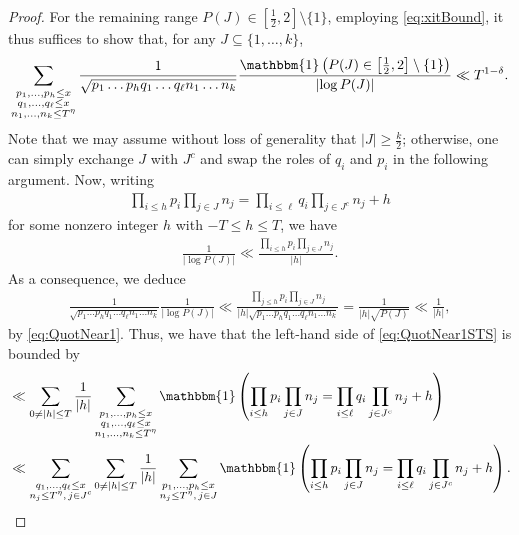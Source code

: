 \documentclass[12pt,oneside,english,a4paper]{amsart}
\theoremstyle{remark}
\numberwithin{equation}{section}
\begin{document}
\begin{proof}
    For the remaining range $P(J)\in[\frac12,2] \setminus \{ 1 \}$, employing \eqref{eq:xitBound}, it thus suffices to show that, for any $J \subseteq \{1,\dots,k\}$,
    \begin{equation}\label{eq:QuotNear1STS} 
        \sum_{\substack{p_1, \dots, p_h  \leq x\\ q_1, \dots, q_\ell\leq x \\ n_1, \dots, n_k \le T^\eta}} 
        \frac{1}{\sqrt{p_1\dots p_h q_1\dots q_\ell n_1\dots n_k}} \frac{\mathbbm{1} \left( P(J) \in \left[ \tfrac{1}{2}, 2 \right] \setminus \{1 \}  \right)}{\left| \log P(J) \right|}  
        \ll T^{1-\delta}.
    \end{equation}
    Note that we may assume without loss of generality that $|J| \ge \frac{k}{2}$; otherwise, one can simply exchange $J$ with $J^c$ and swap the roles of $q_i$ and $p_i$ in the following argument. 
    Now, writing
    \begin{align}\label{eq:shiftbyh}
        \prod_{i\leq h} p_i \prod_{j\in J} n_j=\prod_{i\leq \ell} q_i \prod_{j\in J^c} n_j +h
    \end{align}
    for some nonzero integer $h$ with $-T\leq h\leq T$, we have
    \begin{align*}
        \frac{1}{\vert \log P(J)\vert}\ll \frac{\prod_{i\leq h} p_i \prod_{j\in J} n_j}{\vert h\vert}.
    \end{align*}
    As a consequence, we deduce
    \begin{align*}
        \frac{1}{\sqrt{p_1\dots p_h q_1\dots q_\ell n_1\dots n_k}} \frac{1}{\left| \log P(J) \right|} 
        \ll  \frac{\prod_{j\leq h} p_i \prod_{j\in J} n_j}{|h|\sqrt{p_1\dots p_h q_1\dots q_\ell n_1\dots n_k}} 
        = \frac{1}{|h|\sqrt{P(J)}} 
        \ll \frac{1}{|h|}  ,
    \end{align*}
    by \eqref{eq:QuotNear1}. Thus, we have that the left-hand side of \eqref{eq:QuotNear1STS} is bounded by
    \begin{align*}
        &\ll \sum_{0\neq |h| \leq T} \frac{1}{|h|} \sum_{\substack{p_1, \dots, p_h  \leq x\\ q_1, \dots, q_\ell\leq x \\ n_1, \dots, n_k  \leq T^\eta}} \mathbbm{1} \left( \prod_{i\leq h} p_i \prod_{j\in J} n_j = \prod_{i\leq \ell} q_i \prod_{j\in J^c} n_j+h \right)\\
        &\ll \sum_{\substack{q_1,\dots,q_\ell \leq x \\ n_j\leq T^\eta,\, j\in J^c}}  \sum_{0\neq |h| \leq T} \frac{1}{|h|} \sum_{\substack{p_1, \dots, p_h  \leq x \\ n_j \leq T^\eta, \, j\in J}} \mathbbm{1} \left( \prod_{i\leq h} p_i \prod_{j\in J} n_j = \prod_{i\leq \ell} q_i \prod_{j\in J^c} n_j+h \right).

\end{align*}
\end{proof}
\end{document}
